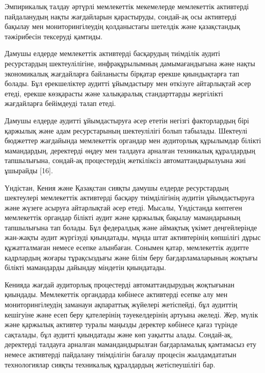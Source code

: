 \begin{multicols}{2}
Эмпирикалық талдау әртүрлі мемлекеттік мекемелерде мемлекеттік
активтерді пайдаланудың нақты жағдайларын қарастыруды, сондай-ақ осы
активтерді бақылау мен мониторингілеудің қолданыстағы шетелдік және
қазақстандық тәжірибесін тексеруді қамтиды.

Дамушы елдерде мемлекеттік активтерді басқарудың тиімділік аудиті
ресурстардың шектеулілігіне, инфрақұрылымның дамымағандығына және нақты
экономикалық жағдайларға байланысты бірқатар ерекше қиындықтарға тап
болады. Бұл ерекшеліктер аудитті ұйымдастыру мен өткізуге айтарлықтай
әсер етеді, ерекше көзқарасты және халықаралық стандарттарды жергілікті
жағдайларға бейімдеуді талап етеді.

Дамушы елдерде аудитті ұйымдастыруға әсер ететін негізгі факторлардың
бірі қаржылық және адам ресурстарының шектеулілігі болып табылады.
Шектеулі бюджеттер жағдайында мемлекеттік органдар мен аудиторлық
құрылымдар білікті мамандардың, деректерді өңдеу мен талдауға арналған
техникалық құралдардың тапшылығына, сондай-ақ процестердің жеткіліксіз
автоматтандырылуына жиі ұшырайды {[}16{]}.

Үндістан, Кения және Қазақстан сияқты дамушы елдерде ресурстардың
шектеулері мемлекеттік активтерді басқару тиімділігінің аудитін
ұйымдастыруға және жүзеге асыруға айтарлықтай әсер етеді. Мысалы,
Үндістанда көптеген мемлекеттік органдар білікті аудит және қаржылық
бақылау мамандарының тапшылығына тап болады. Бұл федералдық және
аймақтық үкімет деңгейлерінде жан-жақты аудит жүргізуді қиындатады,
мұнда штат активтерінің көпшілігі дұрыс құжатталмаған немесе есепке
алынбаған. Сонымен қатар, мемлекеттік аудитте кадрлардың жоғары
тұрақсыздығы және білім беру бағдарламаларының жоқтығы білікті
мамандарды дайындау міндетін қиындатады.

Кенияда жағдай аудиторлық процестерді автоматтандырудың жоқтығынан
қиындады. Мемлекеттік органдарда көбінесе активтерді есепке алу мен
мониторингілеудің заманауи ақпараттық жүйелері жетіспейді, бұл аудиттің
кешігуіне және есеп беру қателерінің тәуекелдерінің артуына әкеледі.
Жер, мүлік және қаржылық активтер туралы маңызды деректер көбінесе қағаз
түрінде сақталады, бұл аудитті қиындатады және көп уақытты алады.
Сондай-ақ, деректерді талдауға арналған мамандандырылған бағдарламалық
қамтамасыз ету немесе активтерді пайдалану тиімділігін бағалау процесін
жылдамдататын технологиялар сияқты техникалық құралдардың жетіспеушілігі
бар.
\end{multicols}


